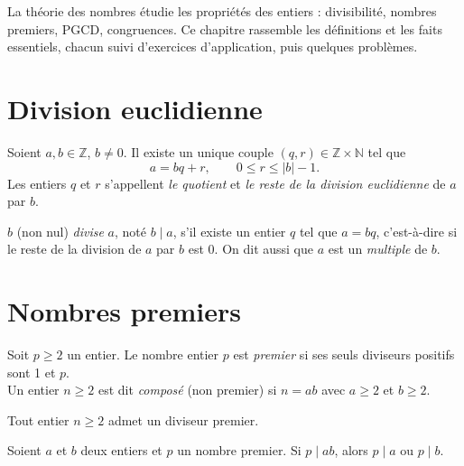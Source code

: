 \documentclass[11pt]{article}
\begin{document}

La théorie des nombres étudie les propriétés des entiers : divisibilité, nombres premiers, PGCD, congruences. Ce chapitre rassemble les définitions et les faits essentiels, chacun suivi d'exercices d'application, puis quelques problèmes.

\section{Division euclidienne}\label{sec:division-euclidienne}

\begin{theoreme}
	Soient $a, b \in \mathbb{Z}$, $b \neq 0$. Il existe un unique couple $(q, r) \in \mathbb{Z} \times \mathbb{N}$ tel que
	\[
	a = bq + r, \qquad 0 \leq r \leq |b| - 1.
	\]
	Les entiers $q$ et $r$ s'appellent \textit{le quotient} et \textit{le reste de la division euclidienne} de $a$ par $b.$
\end{theoreme}

\begin{definition}[Divisibilité]
	$b$ (non nul) \textit{divise} $a$, noté $b \mid a$, s'il existe un entier $q$ tel que $a = bq$, c'est-à-dire si le reste de la division de $a$ par $b$ est $0.$ On dit aussi que $a$ est un \textit{multiple} de $b$.
\end{definition}


\section{Nombres premiers}\label{sec:nombres-premiers}

\begin{definition}
	Soit $p \geq 2$ un entier. Le nombre entier $p$ est \textit{premier} si ses seuls diviseurs positifs sont 1 et $p$.\\
	\quad Un entier $n \geq 2$ est dit \textit{composé} (non premier) si $n = ab$ avec $a \geq 2$ et $b \geq 2$.
\end{definition}

\begin{proposition}
	Tout entier $n \geq 2$ admet un diviseur premier.
\end{proposition}

\begin{proposition}
	Soient $a$ et $b$ deux entiers et $p$ un nombre premier. Si $p \mid ab$, alors $p \mid a$ ou $p \mid b$.
\end{proposition}
\end{document}
